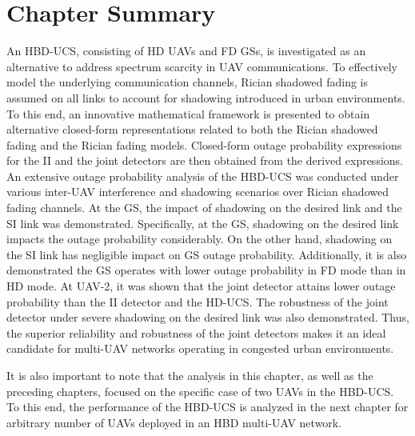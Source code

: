 \section{Chapter Summary} \label{HBD_UCS_Rician_Shadowed_sec_conclusion}
An HBD-UCS, consisting of HD UAVs and FD GSs, is investigated as an alternative to address spectrum scarcity in UAV communications. To effectively model the underlying communication channels, Rician shadowed fading is assumed on all links to account for shadowing introduced in urban environments. To this end, an innovative mathematical framework is presented to obtain alternative closed-form representations related to both the Rician shadowed fading and the Rician fading models. Closed-form outage probability expressions for the II and the joint detectors are then obtained from the derived expressions. An extensive outage probability analysis of the HBD-UCS was conducted under various inter-UAV interference and shadowing scenarios over Rician shadowed fading channels. At the GS, the impact of shadowing on the desired link and the SI link was demonstrated. Specifically, at the GS, shadowing on the desired link impacts the outage probability considerably. On the other hand, shadowing on the SI link has negligible impact on GS outage probability. Additionally, it is also demonstrated the GS operates with lower outage probability in FD mode than in HD mode. At UAV-2, it was shown that the joint detector attains lower outage probability than the II detector and the HD-UCS. The robustness of the joint detector under severe shadowing on the desired link was also demonstrated. Thus, the superior reliability and robustness of the joint detectors makes it an ideal candidate for multi-UAV networks operating in congested urban environments. 

It is also important to note that the analysis in this chapter, as well as the preceding chapters, focused on the specific case of two UAVs in the HBD-UCS. To this end, the performance of the HBD-UCS is analyzed in the next chapter for arbitrary number of UAVs deployed in an HBD multi-UAV network.



